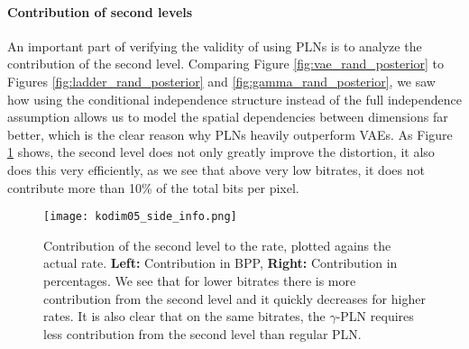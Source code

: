 \paragraph{Contribution of second levels}
An important part of verifying the validity of using PLNs is to analyze the
contribution of the second level. Comparing Figure \ref{fig:vae_rand_posterior}
to Figures \ref{fig:ladder_rand_posterior} and \ref{fig:gamma_rand_posterior},
we saw how using the conditional independence structure instead of the
full independence assumption allows us to model the spatial dependencies between
dimensions far better, which is the clear reason why PLNs heavily outperform VAEs.
As Figure \ref{fig:kodim05_side_info} shows, the second level does not only
greatly improve the distortion, it also does this very efficiently, as we see that
above very low bitrates, it does not contribute more than 10\% of the total bits
per pixel.
\begin{figure}
  \centering
  \texttt{[image: kodim05\_side\_info.png]}
  \caption[Contribution of the second level to the rate, plotted agains the
    actual rate.]{Contribution of the second level to the rate, plotted agains the
    actual rate. \textbf{Left:} Contribution in BPP, \textbf{Right:}
    Contribution in percentages. We see that for lower bitrates there is more
    contribution from the second level and it quickly decreases for higher
    rates. It is also clear that on the same bitrates, the $\gamma$-PLN requires
    less contribution from the second level than regular PLN.}
  \label{fig:kodim05_side_info}
\end{figure}

